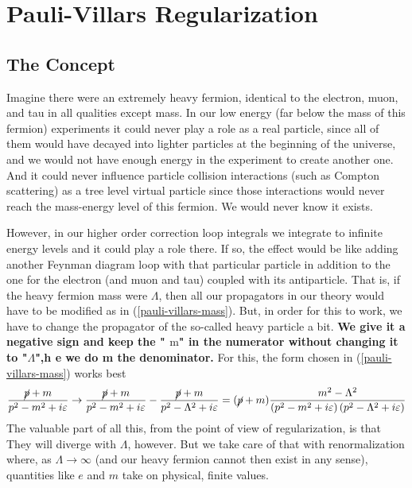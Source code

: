 \section{Pauli-Villars Regularization}
\subsection{The Concept}
Imagine there were an extremely heavy fermion, identical to the electron, muon, and tau in all qualities except mass. In our low energy (far below the mass of this fermion) experiments it could never play a role as a real particle, since all of them would have decayed into lighter particles at the beginning of the universe, and we would not have enough energy in the experiment to create another one. And it could never influence particle collision interactions (such as Compton scattering) as a tree level virtual particle since those interactions would never reach the mass-energy level of this fermion. We would never know it exists.

However, in our higher order correction loop integrals we integrate to infinite energy levels and it could play a role there. If so, the effect would be like adding another Feynman diagram loop with that particular particle in addition to the one for the electron (and muon and tau) coupled with its antiparticle. That is, if the heavy fermion mass were $\Lambda$, then all our propagators in our theory would have to be modified as in (\ref{pauli-villars-mass}). But, in order for this to work, we have to change the propagator of the so-called heavy particle a bit. \textbf{We give it a negative sign and keep the " $\mathrm{m}$" in the numerator without changing it to "$\Lambda$",h e we do m the denominator.}  For this, the form chosen in (\ref{pauli-villars-mass}) works best
\begin{equation}
\frac{\cancel{p}+m}{p^{2}-m^{2}+i \varepsilon} \rightarrow \frac{\cancel{p}+m}{p^{2}-m^{2}+i \varepsilon}-\frac{\cancel{p}+m}{p^{2}-\Lambda^{2}+i \varepsilon}=(\cancel{p}+m) \frac{m^{2}-\Lambda^{2}}{\left(p^{2}-m^{2}+i \varepsilon\right)\left(p^{2}-\Lambda^{2}+i \varepsilon\right)}
\label{pauli-villars-mass}
\end{equation}
The valuable part of all this, from the point of view of regularization, is that  They will diverge with $\Lambda$, however. But we take care of that with renormalization where, as $\Lambda \rightarrow \infty$ (and our heavy fermion cannot then exist in any sense), quantities like $e$ and $m$ take on physical, finite values.
